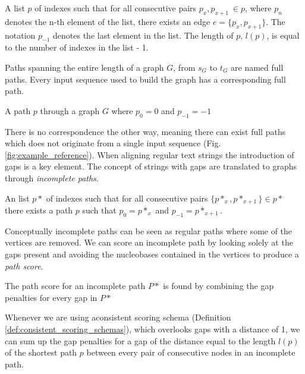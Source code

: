 \documentclass[thesis.tex]{subfiles}
\begin{document}
{\begin{defn}
  A list $p$ of indexes such that for all consecutive pairs $p_x, p_{x+1}\ \in p$, where $p_n$ denotes the n-th element of the list, there exists an edge $e=\{p_x, p_{x+1}\}$. The notation $p_{-1}$ denotes the last element in the list. The length of $p$, $l(p)$, is equal to the number of indexes in the list - 1.
\end{defn}
Paths spanning the entire length of a graph $G$, from $s_G$ to $t_G$ are named full paths. Every input sequence used to build the graph has a corresponding full path.
\begin{defn}
  A path $p$ through a graph $G$ where $p_0=0$ and $p_{-1}=-1$
\end{defn}
There is no correspondence the other way, meaning there can exist full paths which does not originate from a single input sequence (Fig. \ref{fig:example_reference}). When aligning regular text strings the introduction of gaps is a key element. The concept of strings with gaps are translated to graphs through \textit{incomplete paths}.
\begin{defn}
  An list $p*$ of indexes such that for all consecutive pairs $\{p*_x, p*_{x+1}\} \in p*$ there exists a path $p$ such that $p_0=p*_x$ and $p_{-1}=p*_{x+1}$.
\end{defn}
Conceptually incomplete paths can be seen as regular paths where some of the vertices are removed. We can score an incomplete path by looking solely at the gaps present and avoiding the nucleobases contained in the vertices to produce a \textit{path score}.
\begin{defn}
  The path score for an incomplete path $P*$ is found by combining the gap penalties for every gap in $P*$
\end{defn}
Whenever we are using aconsistent scoring schema (Definition \ref{def:consistent_scoring_schemas}), which overlooks gaps with a distance of 1, we can sum up the gap penalties for a gap of the distance equal to the length $l(p)$ of the shortest path $p$ between every pair of consecutive nodes in an incomplete path.
\begin{figure}
  \begin{mdframed}
    \begin{center}
\end{center}
\end{mdframed}
\end{figure}}
\end{document}
